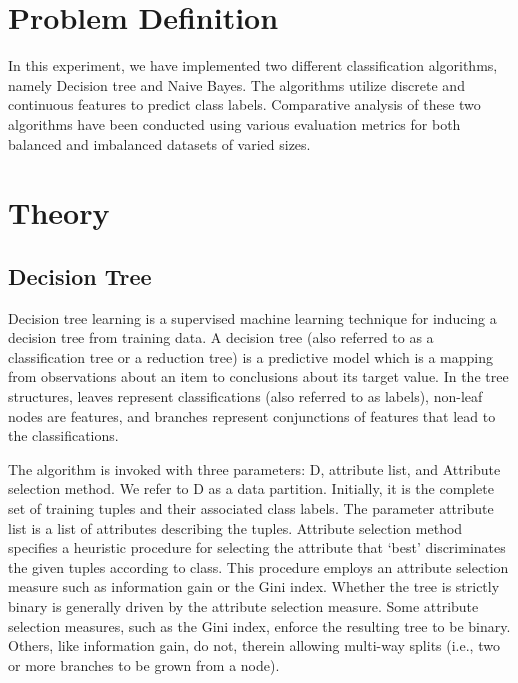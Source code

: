 \documentclass[12pt]{article}
\begin{document}
\maketitle
\thispagestyle{empty}
\clearpage
\newpage

\section{Problem Definition}
In this experiment, we have implemented two different classification algorithms, namely Decision tree and Naive Bayes. The algorithms utilize discrete and continuous features to predict class labels. Comparative analysis of these two algorithms have been conducted using various evaluation metrics for both balanced and imbalanced datasets of varied sizes.



\section{Theory}
\subsection{Decision Tree}
Decision tree learning is a supervised machine learning technique for inducing a decision tree from training data. A decision tree (also referred to as a classification tree or a reduction tree) is a predictive model which is a mapping from observations about an item to conclusions about its target value. In the tree structures, leaves represent classifications (also referred to as labels), non-leaf nodes are features, and branches represent conjunctions of features that lead to the classifications.

The algorithm is invoked with three parameters: D, attribute list, and Attribute selection method. We refer to D as a data partition. Initially, it is the complete set of training tuples and their associated class labels. The parameter attribute list is a list of attributes describing the tuples. Attribute selection method specifies a heuristic procedure for selecting the attribute that `best' discriminates the given tuples according to class. This procedure employs an attribute selection measure such as information gain or the Gini index. Whether the tree is strictly binary is generally driven by the attribute selection measure. Some attribute selection measures, such as the Gini index, enforce the resulting tree to be binary. Others, like information gain, do not, therein allowing multi-way splits (i.e., two or more branches to be grown from a node).
\end{document}
